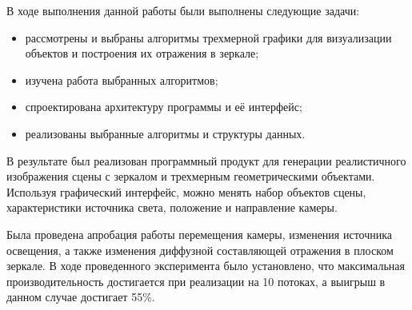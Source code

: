 
В ходе выполнения данной работы были выполнены следующие задачи:
\begin{itemize}
	\item рассмотрены и выбраны алгоритмы трехмерной графики для визуализации объектов и построения их отражения в зеркале;
	\item изучена работа выбранных алгоритмов;
	\item спроектирована архитектуру программы и её интерфейс;
	\item реализованы выбранные алгоритмы и структуры данных.
\end{itemize}

В результате был реализован программный продукт для генерации реалистичного изображения сцены с зеркалом и трехмерным геометрическими объектами. Используя графический интерфейс, можно менять набор объектов сцены, характеристики источника света, положение и направление камеры.

Была проведена апробация работы перемещения камеры, изменения источника освещения, а также изменения диффузной составляющей отражения в плоском зеркале. В ходе проведенного эксперимента было установлено, что максимальная производительность достигается при реализации на 10 потоках, а выигрыш в данном случае достигает 55\%. 